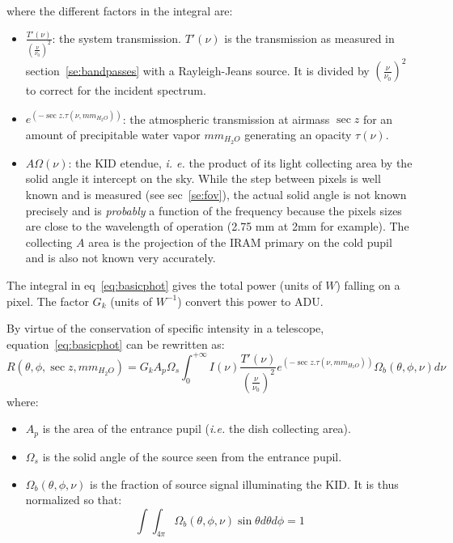 where the different factors in the integral are:
\begin{itemize}
\item $\frac{T'(\nu)}{\left(\frac{\nu}{\nu_{0}}\right)^{2}}$:  the
  system transmission. $T'(\nu)$ is the transmission as measured in
  section~\ref{se:bandpasses} with a Rayleigh-Jeans source. It is
  divided by $\left(\frac{\nu}{\nu_{0}}\right)^{2}$ to correct for the
  incident spectrum.
\item $e^{\left(-\sec z . \tau(\nu,  mm_{H_{2}O} )\right)}$: the
  atmospheric transmission at airmass  $\sec z$ for an amount of
  precipitable water vapor $mm_{H_{2}O}$ generating an opacity $\tau(\nu)$.
\item $A\Omega (\nu) $: the KID etendue, {\it i. e.} the product of
  its light collecting area by the solid angle it intercept on the
  sky. While the step between  pixels is well known and is measured (see sec~\ref{se:fov}), the
  actual solid angle is not known precisely and is {\em probably} a function of the
  frequency  because the pixels sizes are close to the wavelength of
  operation (2.75 mm at 2mm for example). The collecting $A$ area is the
  projection of the IRAM primary on the cold pupil and is also not
  known very accurately.
\end{itemize}
The integral in eq~\ref{eq:basicphot} gives the total power (units of $W$)
falling on a pixel. The factor $G_{k}$ (units of  $W^{-1}$) convert this
power to ADU. 

By virtue of the conservation of specific intensity in a telescope,
equation~\ref{eq:basicphot} can be rewritten as:
\begin{equation}
R(\theta, \phi, \sec z, mm_{H_{2}O}) = G_{k} A_{p}\Omega_{s}\int_{0}^{+\infty} I(\nu)
\frac{T'(\nu)}{\left(\frac{\nu}{\nu_{0}}\right)^{2}} e^{\left(-\sec z
  . \tau(\nu,  mm_{H_{2}O})\right)} \Omega_{b} (\theta, \phi, \nu)  d\nu 
\label{eq:basicphot2}
\end{equation}
where:
\begin{itemize}
\item $A_{p}$ is the area of the entrance pupil ({\it i.e.} the
  dish collecting area).
\item $\Omega_{s}$ is the solid angle of the source seen from the
  entrance pupil.
\item $\Omega_{b}(\theta, \phi, \nu)$ is the fraction of source signal
  illuminating the KID. It is thus normalized so that:
\begin{equation}
\int\int_{4\pi} \Omega_{b}(\theta, \phi, \nu) \sin \theta d\theta
d\phi = 1 
\label{eq:omegabdef}
\end{equation}
\end{itemize}

